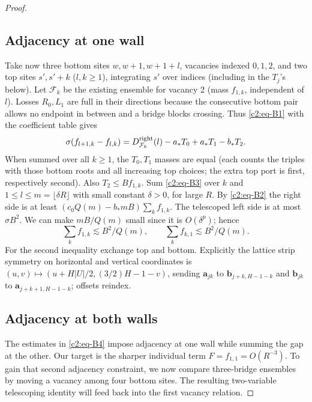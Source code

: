 \begin{proof}
\subsection{Adjacency at one wall}
Take now three bottom sites \(w,w+1,w+1+l\), vacancies indexed \(0,1,2\), and two top sites \(s',s'+k\) (\(l,k\ge1\)), integrating \(s'\) over indices (including in the \(T_j\)'s below). Let \(\mathcal F_k\) be the existing ensemble for vacancy 2 (mass \(f_{1,k}\), independent of \(l\)). Losses \(R_0,L_1\) are full in their directions because the consecutive bottom pair allows no endpoint in between and a bridge blocks crossing. Thus \eqref{c2:eq-B1} with the coefficient table gives
\begin{equation}
 \sigma(f_{l+1,k}-f_{l,k})=D^{\rm right}_{\mathcal F_k}(l)-a_*T_0+a_*T_1-b_*T_2.       \label{c2:eq-B3}
\end{equation}
When summed over all \(k\ge1\), the \(T_0,T_1\) masses are equal (each counts the triples with those bottom roots and all increasing top choices; the extra top port is first, respectively second). Also \(T_2\le B f_{1,k}\). Sum \eqref{c2:eq-B3} over \(k\) and \(1\le l\le m=\lfloor\delta R\rfloor\) with small constant \(\delta>0\), for large \(R\). By \eqref{c2:eq-B2} the right side is at least \((c_0 Q(m)-b_*mB)\sum_k f_{1,k}\). The telescoped left side is at most \(\sigma B^2\). We can make \(mB/Q(m)\) small since it is \(O(\delta^p)\); hence
\begin{equation}
 \sum_k f_{1,k}\lesssim B^2/Q(m),\qquad
 \sum_k f_{k,1}\lesssim B^2/Q(m).                                          \label{c2:eq-B4}
\end{equation}
For the second inequality exchange top and bottom. Explicitly the lattice strip symmetry on horizontal and vertical coordinates is
\((u,v)\mapsto(u+H|U|/2,(3/2)H-1-v)\), sending \(\mathbf a_{jk}\) to \(\mathbf b_{j+k,H-1-k}\) and \(\mathbf b_{jk}\) to \(\mathbf a_{j+k+1,H-1-k}\); offsets reindex.

\subsection{Adjacency at both walls}
The estimates in \eqref{c2:eq-B4} impose adjacency at one wall while
summing the gap at the other. Our target is the sharper individual term
\(F=f_{1,1}=O(R^{-3})\). To gain that second adjacency constraint, we now
compare three-bridge ensembles by moving a vacancy among four bottom
sites. The resulting two-variable telescoping identity will feed back
into the first vacancy relation.


\end{proof}
